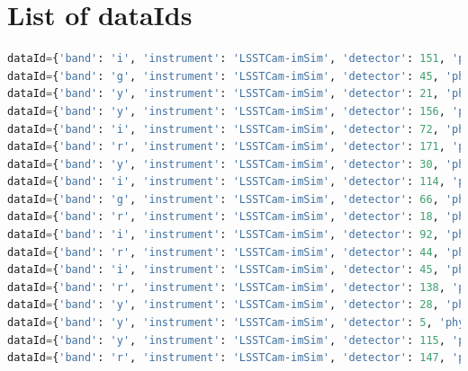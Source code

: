 \documentclass[DM,authoryear,toc]{lsstdoc}
\begin{document}
\section{List of dataIds}
\label{app:ids}
\begin{lstlisting}[language=Python, basicstyle=\tiny]
dataId={'band': 'i', 'instrument': 'LSSTCam-imSim', 'detector': 151, 'physical_filter': 'i_sim_1.4', 'visit': 1030665} records=None
dataId={'band': 'g', 'instrument': 'LSSTCam-imSim', 'detector': 45, 'physical_filter': 'g_sim_1.4', 'visit': 1039948} records=None
dataId={'band': 'y', 'instrument': 'LSSTCam-imSim', 'detector': 21, 'physical_filter': 'y_sim_1.4', 'visit': 1010524} records=None
dataId={'band': 'y', 'instrument': 'LSSTCam-imSim', 'detector': 156, 'physical_filter': 'y_sim_1.4', 'visit': 1012086} records=None
dataId={'band': 'i', 'instrument': 'LSSTCam-imSim', 'detector': 72, 'physical_filter': 'i_sim_1.4', 'visit': 1030670} records=None
dataId={'band': 'r', 'instrument': 'LSSTCam-imSim', 'detector': 171, 'physical_filter': 'r_sim_1.4', 'visit': 1006059} records=None
dataId={'band': 'y', 'instrument': 'LSSTCam-imSim', 'detector': 30, 'physical_filter': 'y_sim_1.4', 'visit': 647595} records=None
dataId={'band': 'i', 'instrument': 'LSSTCam-imSim', 'detector': 114, 'physical_filter': 'i_sim_1.4', 'visit': 1013711} records=None
dataId={'band': 'g', 'instrument': 'LSSTCam-imSim', 'detector': 66, 'physical_filter': 'g_sim_1.4', 'visit': 1019980} records=None
dataId={'band': 'r', 'instrument': 'LSSTCam-imSim', 'detector': 18, 'physical_filter': 'r_sim_1.4', 'visit': 1052891} records=None
dataId={'band': 'i', 'instrument': 'LSSTCam-imSim', 'detector': 92, 'physical_filter': 'i_sim_1.4', 'visit': 1030665} records=None
dataId={'band': 'r', 'instrument': 'LSSTCam-imSim', 'detector': 44, 'physical_filter': 'r_sim_1.4', 'visit': 1052890} records=None
dataId={'band': 'i', 'instrument': 'LSSTCam-imSim', 'detector': 45, 'physical_filter': 'i_sim_1.4', 'visit': 1013734} records=None
dataId={'band': 'r', 'instrument': 'LSSTCam-imSim', 'detector': 138, 'physical_filter': 'r_sim_1.4', 'visit': 1052890} records=None
dataId={'band': 'y', 'instrument': 'LSSTCam-imSim', 'detector': 28, 'physical_filter': 'y_sim_1.4', 'visit': 1032264} records=None
dataId={'band': 'y', 'instrument': 'LSSTCam-imSim', 'detector': 5, 'physical_filter': 'y_sim_1.4', 'visit': 1032264} records=None
dataId={'band': 'y', 'instrument': 'LSSTCam-imSim', 'detector': 115, 'physical_filter': 'y_sim_1.4', 'visit': 646755} records=None
dataId={'band': 'r', 'instrument': 'LSSTCam-imSim', 'detector': 147, 'physical_filter': 'r_sim_1.4', 'visit': 1049332} records=None

\end{lstlisting}
\end{document}
